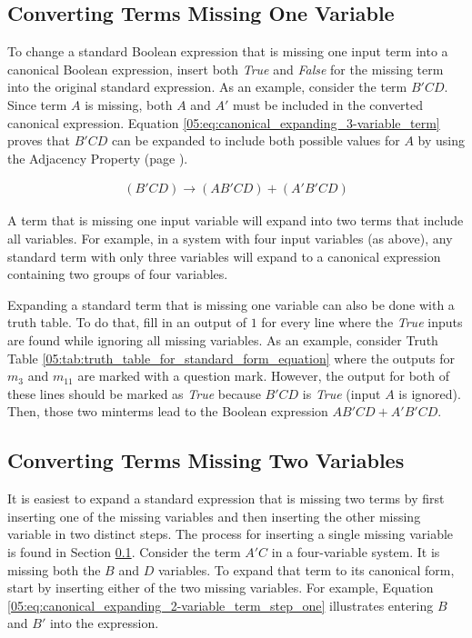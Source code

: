 \subsection{Converting Terms Missing One Variable}
\label{05:subsec:converting_terms_missing_one_variable}

To change a standard Boolean expression that is missing one input term into a canonical Boolean expression, insert both \emph{True} and \emph{False} for the missing term into the original standard expression. As an example, consider the term $ B'CD $. Since term $ A $ is missing, both $ A $ and $ A' $ must be included in the converted canonical expression. Equation \ref{05:eq:canonical_expanding_3-variable_term} proves that $ B'CD $ can be expanded to include both possible values for $ A $ by using the Adjacency Property (page \pageref{BF:subsec:adjacency_property}).

\begin{align}
  \label{05:eq:canonical_expanding_3-variable_term}
  (B'CD) \rightarrow (AB'CD)+(A'B'CD)
\end{align}

A term that is missing one input variable will expand into two terms that include all variables. For example, in a system with four input variables (as above), any standard term with only three variables will expand to a canonical expression containing two groups of four variables. 

Expanding a standard term that is missing one variable can also be done with a truth table. To do that, fill in an output of $ 1 $ for every line where the \emph{True} inputs are found while ignoring all missing variables. As an example, consider Truth Table \ref{05:tab:truth_table_for_standard_form_equation} where the outputs for $ m_3 $ and $ m_11 $ are marked with a question mark. However, the output for both of these lines should be marked as \emph{True} because  $ B'CD $ is \emph{True} (input $ A $ is ignored). Then, those two minterms lead to the Boolean expression $ AB'CD + A'B'CD $.

\subsection{Converting Terms Missing Two Variables}
\label{05:subsec:converting_terms_missing_two_variables}

It is easiest to expand a standard expression that is missing two terms by first inserting one of the missing variables and then inserting the other missing variable in two distinct steps. The process for inserting a single missing variable is found in Section \ref{05:subsec:converting_terms_missing_one_variable}. Consider the term $ A'C $ in a four-variable system. It is missing both the $ B $ and $ D $ variables. To expand that term to its canonical form, start by inserting either of the two missing variables. For example, Equation \ref{05:eq:canonical_expanding_2-variable_term_step_one} illustrates entering $ B $ and $ B' $ into the expression.

